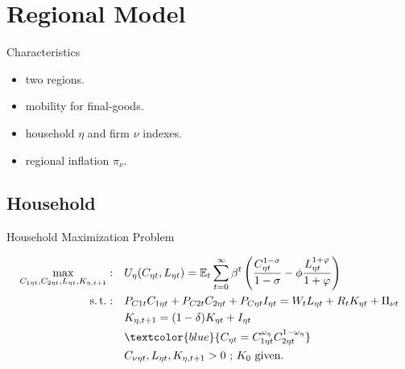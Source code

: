 \documentclass[../quali_slides.tex]{subfiles}
\begin{document}
\section{Regional Model}


\begin{frame}{Characteristics}
	
	\begin{itemize}
		
		\item two regions.
		
		\item mobility for final-goods.
		
		\item household $\eta$ and firm $\nu$ indexes.
		
		\item regional inflation $\pi_{\nu}$.
		
	\end{itemize}
	
\end{frame}


\subsection{Household}

\begin{frame}{Household Maximization Problem}
	
\begin{align}
	\max_{C_{1\eta t}, C_{2\eta t}, L_{\eta t},K_{\eta, t+1}}: \quad & U_{\eta}(C_{\eta t},L_{\eta t}) = \E \sum_{t=0}^{\infty} \beta^t \left(\frac{C_{\eta t}^{1-\sigma}}{1-\sigma} - \phi \frac{L_{\eta t}^{1+\varphi}}{1+\varphi} \right) \label{eq:reg-utility-function-0} \\
	\st: \quad & P_{C1t} C_{1\eta t} + P_{C2t} C_{2\eta t} + P_{C\eta t} I_{\eta t} = W_t L_{\eta t} + R_t K_{\eta t} + \Pi_{\nu t} \label{eq:reg-budget-constraint} \\
	\quad & K_{\eta, t+1} = (1-\delta)K_{\eta t} + I_{\eta t} \label{eq:reg-law-of-motion-for-capital} \\
	\quad & \textcolor{blue}{C_{\eta t} = C_{1\eta t}^{\omega_{\eta}} C_{2\eta t}^{1-\omega_{\eta}}}  \label{eq:reg-consumption-aggregation} \\
	\quad & C_{\nu\eta t}, L_{\eta t}, K_{\eta, t+1} > 0 \text{ ; $K_0$ given.} \nonumber
\end{align}
	
\end{frame}
\end{document}
